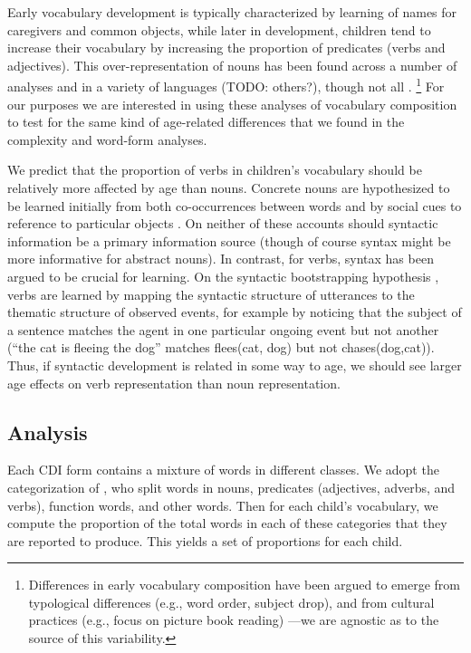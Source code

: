 \documentclass[10pt,letterpaper]{article}
\begin{document}
Early vocabulary development is typically characterized by learning of names for caregivers and common objects, while later in development, children tend to increase their vocabulary by increasing the proportion of predicates (verbs and adjectives). This over-representation of nouns has been found across a number of analyses and in a variety of languages \cite{bates1994}(TODO: others?), though not all \cite{caselli1995}.
\footnote{Differences in early vocabulary composition have been argued to emerge from typological differences (e.g., word order, subject drop), and from cultural practices (e.g., focus on picture book reading) \cite{tardif1999, gopnik1996, choi1995}---we are agnostic as to the source of this variability.}
For our purposes we are interested in using these analyses of vocabulary composition to test for the same kind of age-related differences that we found in the complexity and word-form analyses. 

We predict that the proportion of verbs in children's vocabulary should be relatively more affected by age than nouns. Concrete nouns are hypothesized to be learned initially from both co-occurrences between words \cite{yu2007b} and by social cues to reference to particular objects \cite{bloom2002}. On neither of these accounts should syntactic information be a primary information source (though of course syntax might be more informative for abstract nouns). In contrast, for verbs, syntax has been argued to be crucial for learning. On the syntactic bootstrapping hypothesis \cite{gleitman1990,fisher1991}, verbs are learned by  mapping the syntactic structure of utterances to the thematic structure of observed events, for example by noticing that the subject of a sentence matches the agent in one particular ongoing event but not another (``the cat is fleeing the dog'' matches  {\sc flees(cat, dog)} but not {\sc chases(dog,cat)}). Thus, if syntactic development is related in some way to age, we should see larger age effects on verb representation than noun representation. 

\subsection{Analysis}

Each CDI form contains a mixture of words in different classes. We adopt the categorization of , who split words in nouns, predicates (adjectives, adverbs, and verbs), function words, and other words. Then for each child's vocabulary, we compute the proportion of the total words in each of these categories that they are reported to produce. This yields a set of proportions for each child.
\end{document}
